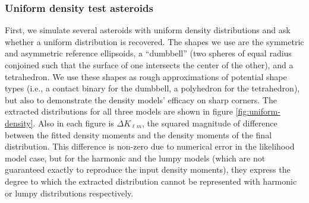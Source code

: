 \documentclass[fleqn,usenatbib]{mnras}
\begin{document}
\subsubsection{Uniform density test asteroids}

First, we simulate several asteroids with uniform density distributions and ask whether a uniform distribution is recovered. The shapes we use are the symmetric and asymmetric reference ellipsoids, a ``dumbbell'' (two spheres of equal radius conjoined such that the surface of one intersects the center of the other), and a tetrahedron. We use these shapes as rough approximations of potential shape types (i.e., a contact binary for the dumbbell, a polyhedron for the tetrahedron), but also to demonstrate the density models' efficacy on sharp corners. The extracted distributions for all three models are shown in figure \ref{fig:uniform-density}. Also in each figure is $\Delta K_{\ell m}$, the squared magnitude of difference between the fitted density moments and the density moments of the final distribution. This difference is non-zero due to numerical error in the likelihood model case, but for the harmonic and the lumpy models (which are not guaranteed exactly to reproduce the input density moments), they express the degree to which the extracted distribution cannot be represented with harmonic or lumpy distributions respectively.
\end{document}
